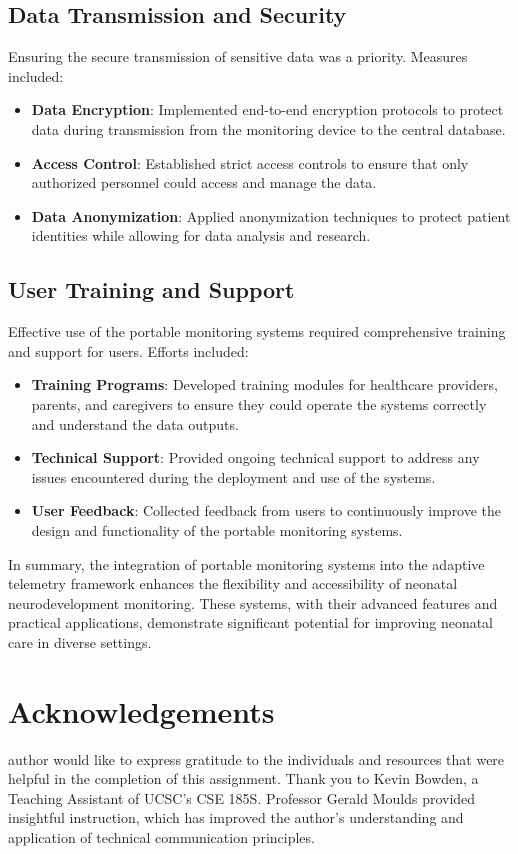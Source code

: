\documentclass[12pt,journal,compsoc]{IEEEtran}
\begin{document}
\subsection{Data Transmission and Security}
Ensuring the secure transmission of sensitive data was a priority. Measures included:
\begin{itemize}
    \item \textbf{Data Encryption}: Implemented end-to-end encryption protocols to protect data during transmission from the monitoring device to the central database.
    \item \textbf{Access Control}: Established strict access controls to ensure that only authorized personnel could access and manage the data.
    \item \textbf{Data Anonymization}: Applied anonymization techniques to protect patient identities while allowing for data analysis and research.
\end{itemize}

\subsection{User Training and Support}
Effective use of the portable monitoring systems required comprehensive training and support for users. Efforts included:
\begin{itemize}
    \item \textbf{Training Programs}: Developed training modules for healthcare providers, parents, and caregivers to ensure they could operate the systems correctly and understand the data outputs.
    \item \textbf{Technical Support}: Provided ongoing technical support to address any issues encountered during the deployment and use of the systems.
    \item \textbf{User Feedback}: Collected feedback from users to continuously improve the design and functionality of the portable monitoring systems.
\end{itemize}

In summary, the integration of portable monitoring systems into the adaptive telemetry framework enhances the flexibility and accessibility of neonatal neurodevelopment monitoring. These systems, with their advanced features and practical applications, demonstrate significant potential for improving neonatal care in diverse settings.

\section*{Acknowledgements}
 author would like to express gratitude to the individuals and resources that were helpful in the completion of this assignment. Thank you to Kevin Bowden, a Teaching Assistant of UCSC's CSE 185S. Professor Gerald Moulds provided insightful instruction, which has improved the author's understanding and application of technical communication principles. 
\end{document}
